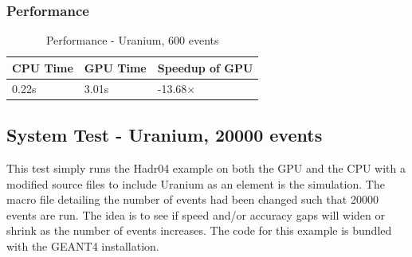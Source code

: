 \documentclass[12pt]{article}
\begin{document}
	\subsubsection{Performance}
		\begin{table}[H]
		\centering
		\caption{Performance - Uranium, 600 events}\label{sys4Perf}
		\begin{tabular}{lll}
		\toprule
		CPU Time& GPU Time&Speedup of GPU\\\midrule
		0.22s&3.01s&-13.68$\times$\\\bottomrule
		\end{tabular}
		\end{table}

\subsection{System Test - Uranium, 20000 events}
This test simply runs the Hadr04 example on both the GPU and the CPU with a modified source files to include Uranium as an element is the simulation. The macro file detailing the number of events had been changed such that 20000 events are run. The idea is to see if speed and/or accuracy gaps will widen or shrink as the number of events increases. The code for this example is bundled with the GEANT4 installation.\\
\break
\end{document}
